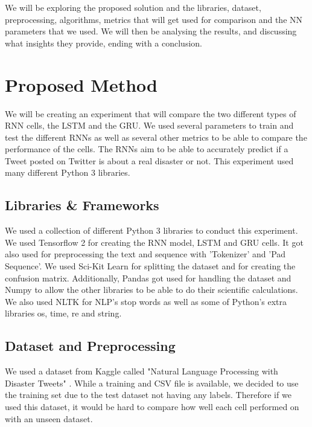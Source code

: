 \documentclass[a4paper,10pt]{article}
\begin{document}
	We will be exploring the proposed solution and the libraries, dataset, preprocessing, algorithms, metrics that will get used for comparison and the NN parameters that we used. We will then be analysing the results, and discussing what insights they provide, ending with a conclusion.


\section{Proposed Method}
	We will be creating an experiment that will compare the two different types of RNN cells, the LSTM and the GRU. We used several parameters to train and test the different RNNs as well as several other metrics to be able to compare the performance of the cells. The RNNs aim to be able to accurately predict if a Tweet posted on Twitter is about a real disaster or not. This experiment used many different Python 3 libraries.

\subsection{Libraries \& Frameworks}
	We used a collection of different Python 3 libraries to conduct this experiment. We used Tensorflow 2 \cite{tensorflow} for creating the RNN model, LSTM and GRU cells. It got also used for preprocessing the text and sequence with 'Tokenizer' and 'Pad Sequence'. We used Sci-Kit Learn \cite{scikit-learn} for splitting the dataset and for creating the confusion matrix. Additionally, Pandas \cite{mckinney-proc-scipy-2010} got used for handling the dataset and Numpy to allow the other libraries to be able to do their scientific calculations. We also used NLTK \cite{Loper02nltk:the} for NLP's stop words as well as some of Python's extra libraries os, time, re and string. 

\subsection{Dataset and Preprocessing}
	We used a dataset from Kaggle called "Natural Language Processing with Disaster Tweets" \cite{disater_kaggle}. While a training and CSV file is available, we decided to use the training set due to the test dataset not having any labels. Therefore if we used this dataset, it would be hard to compare how well each cell performed on with an unseen dataset.
\end{document}
